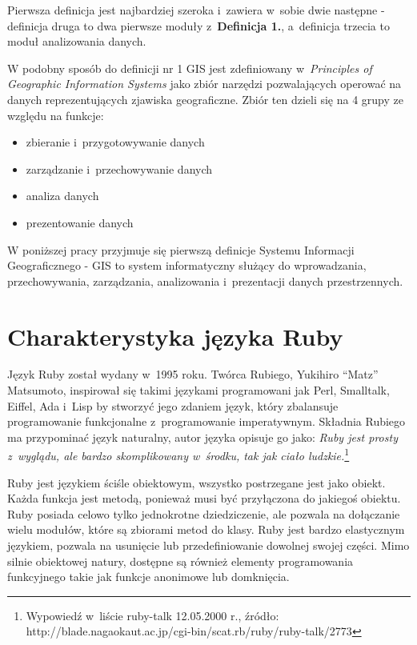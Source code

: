 \documentclass[archivemode]{mgr}
\begin{document}
Pierwsza definicja jest najbardziej szeroka i~zawiera w~sobie dwie następne - definicja druga to dwa pierwsze moduły z~\textbf{Definicja 1.}, a~definicja trzecia to moduł analizowania danych.

W podobny sposób do definicji nr 1 GIS jest zdefiniowany w~\emph{Principles of Geographic Information Systems} \cite{principles_gis} jako zbiór narzędzi pozwalających operować na danych reprezentujących zjawiska geograficzne. Zbiór ten dzieli się na 4 grupy ze względu na funkcje:
  \begin{itemize}
    \item zbieranie i~przygotowywanie danych
    \item zarządzanie i~przechowywanie danych
    \item analiza danych
    \item prezentowanie danych
  \end{itemize}

W poniższej pracy przyjmuje się pierwszą definicje Systemu Informacji Geograficznego - GIS to system informatyczny służący do wprowadzania, przechowywania, zarządzania, analizowania i~prezentacji danych przestrzennych.

\section{Charakterystyka języka Ruby}
Język Ruby został wydany w~1995 roku. Twórca Rubiego, Yukihiro “Matz” Matsumoto, inspirował się takimi językami programowani jak Perl, Smalltalk, Eiffel, Ada i~Lisp by stworzyć jego zdaniem język, który zbalansuje programowanie funkcjonalne z~programowanie imperatywnym. \cite{doc_ruby} Składnia Rubiego ma przypominać język naturalny, autor języka opisuje go jako: \emph{Ruby jest prosty z~wyglądu, ale bardzo skomplikowany w~środku, tak jak ciało ludzkie.}\footnote{Wypowiedź w~liście ruby-talk 12.05.2000 r., źródło: \\http://blade.nagaokaut.ac.jp/cgi-bin/scat.rb/ruby/ruby-talk/2773}

Ruby jest językiem ściśle obiektowym, wszystko postrzegane jest jako obiekt. Każda funkcja jest metodą, ponieważ musi być przyłączona do jakiegoś obiektu. Ruby posiada celowo tylko jednokrotne dziedziczenie, ale pozwala na dołączanie wielu modułów, które są zbiorami metod do klasy. Ruby jest bardzo elastycznym językiem, pozwala na usunięcie lub przedefiniowanie dowolnej swojej części. Mimo silnie obiektowej natury, dostępne są również elementy programowania funkcyjnego takie jak funkcje anonimowe lub domknięcia.
\end{document}
